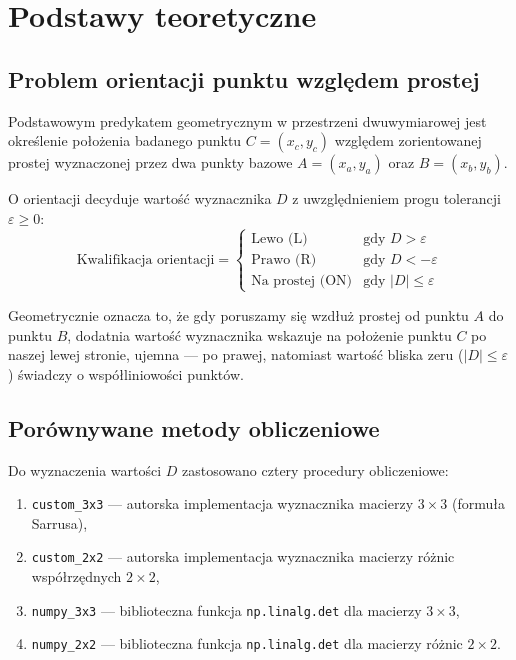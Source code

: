\documentclass[10pt,a4paper]{article}
\begin{document}
\section{Podstawy teoretyczne}

\subsection{Problem orientacji punktu względem prostej}
Podstawowym predykatem geometrycznym w przestrzeni dwuwymiarowej jest określenie położenia badanego punktu $C = (x_c, y_c)$ względem zorientowanej prostej wyznaczonej przez dwa punkty bazowe $A = (x_a, y_a)$ oraz $B = (x_b, y_b)$.

O orientacji decyduje wartość wyznacznika $D$ z uwzględnieniem progu tolerancji $\varepsilon \ge 0$:
\begin{equation}
\text{Kwalifikacja orientacji} = \begin{cases}
\text{Lewo (L)} & \text{gdy } D > \varepsilon \\
\text{Prawo (R)} & \text{gdy } D < -\varepsilon \\
\text{Na prostej (ON)} & \text{gdy } |D| \le \varepsilon
\end{cases}
\end{equation}

Geometrycznie oznacza to, że gdy poruszamy się wzdłuż prostej od punktu $A$ do punktu $B$, dodatnia wartość wyznacznika wskazuje na położenie punktu $C$ po naszej lewej stronie, ujemna --- po prawej, natomiast wartość bliska zeru ($|D| \le \varepsilon$) świadczy o współliniowości punktów.

\subsection{Porównywane metody obliczeniowe}
Do wyznaczenia wartości $D$ zastosowano cztery procedury obliczeniowe:
\begin{enumerate}
    \item \texttt{custom\_3x3} --- autorska implementacja wyznacznika macierzy $3 \times 3$ (formuła Sarrusa),
    \item \texttt{custom\_2x2} --- autorska implementacja wyznacznika macierzy różnic współrzędnych $2 \times 2$,
    \item \texttt{numpy\_3x3} --- biblioteczna funkcja \texttt{np.linalg.det} dla macierzy $3 \times 3$,
    \item \texttt{numpy\_2x2} --- biblioteczna funkcja \texttt{np.linalg.det} dla macierzy różnic $2 \times 2$.
\end{enumerate}
\end{document}
